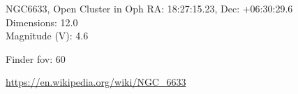 \begin{block}{NGC6633, Open Cluster in Oph}
    RA: 18:27:15.23, Dec: +06:30:29.6 \\ 
    Dimensions: 12.0 \\ 
    Magnitude (V): 4.6



    Finder fov: 60 

    \url{https://en.wikipedia.org/wiki/NGC_6633} 
\end{block}
